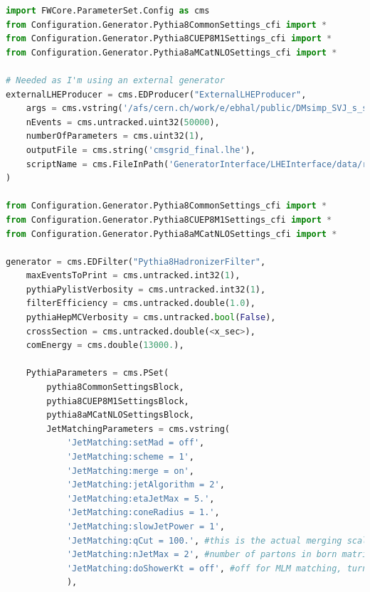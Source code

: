 \begin{lstlisting}[belowskip=-0.7cm, language=Python]
import FWCore.ParameterSet.Config as cms
from Configuration.Generator.Pythia8CommonSettings_cfi import *
from Configuration.Generator.Pythia8CUEP8M1Settings_cfi import *
from Configuration.Generator.Pythia8aMCatNLOSettings_cfi import *

# Needed as I'm using an external generator
externalLHEProducer = cms.EDProducer("ExternalLHEProducer",
    args = cms.vstring('/afs/cern.ch/work/e/ebhal/public/DMsimp_SVJ_s_spin1_slc6_amd64_gcc481_CMSSW_7_1_30_tarball.tar.xz'),
    nEvents = cms.untracked.uint32(50000),
    numberOfParameters = cms.uint32(1),
    outputFile = cms.string('cmsgrid_final.lhe'),
    scriptName = cms.FileInPath('GeneratorInterface/LHEInterface/data/run_generic_tarball_cvmfs.sh')
)

from Configuration.Generator.Pythia8CommonSettings_cfi import *
from Configuration.Generator.Pythia8CUEP8M1Settings_cfi import *
from Configuration.Generator.Pythia8aMCatNLOSettings_cfi import *

generator = cms.EDFilter("Pythia8HadronizerFilter",
    maxEventsToPrint = cms.untracked.int32(1),
    pythiaPylistVerbosity = cms.untracked.int32(1),
    filterEfficiency = cms.untracked.double(1.0),
    pythiaHepMCVerbosity = cms.untracked.bool(False),
    crossSection = cms.untracked.double(<x_sec>),
    comEnergy = cms.double(13000.),

    PythiaParameters = cms.PSet(
        pythia8CommonSettingsBlock,
        pythia8CUEP8M1SettingsBlock,
        pythia8aMCatNLOSettingsBlock,
        JetMatchingParameters = cms.vstring(
            'JetMatching:setMad = off',
            'JetMatching:scheme = 1',
            'JetMatching:merge = on',
            'JetMatching:jetAlgorithm = 2',
            'JetMatching:etaJetMax = 5.',
            'JetMatching:coneRadius = 1.',
            'JetMatching:slowJetPower = 1',
            'JetMatching:qCut = 100.', #this is the actual merging scale                           
            'JetMatching:nJetMax = 2', #number of partons in born matrix element for highest multiplicity
            'JetMatching:doShowerKt = off', #off for MLM matching, turn on for shower-kT matching
            ),


\end{lstlisting}
